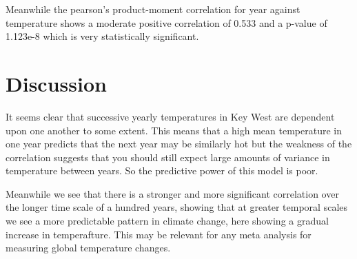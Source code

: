 \documentclass[12pt]{article}
\begin{document}
  Meanwhile the pearson's product-moment correlation for year against temperature shows a moderate positive correlation of 0.533 and a p-value of 1.123e-8 which is very statistically significant.

  \section{Discussion}
  It seems clear that successive yearly temperatures in Key West are dependent upon one another to some extent. This means that a high mean temperature in one year predicts that the 
  next year may be similarly hot but the weakness of the correlation suggests that you should still expect large amounts of variance in temperature between years. So the predictive power 
  of this model is poor.

  Meanwhile we see that there is a stronger and more significant correlation over the longer time scale of a hundred years, showing that at greater temporal scales 
  we see a more predictable pattern in climate change, here showing a gradual increase in temperafture. This may be relevant for any meta analysis for measuring global temperature
  changes.
\end{document}

